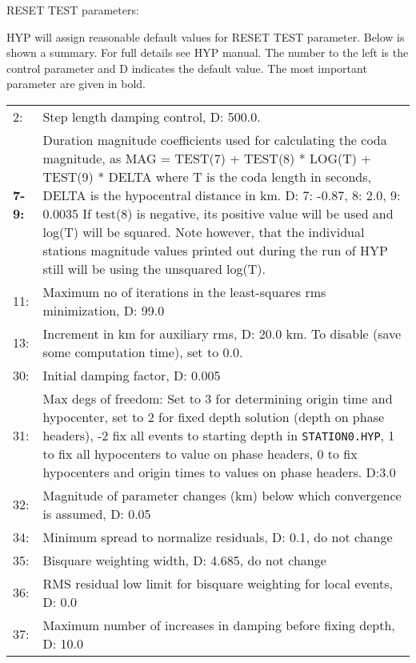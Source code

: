 RESET TEST parameters: 

HYP will assign reasonable default values for RESET TEST parameter. Below is shown a summary. For full details see HYP manual. The number to the left is the control parameter and D indicates the default value. The most important parameter are given in bold. 

\begin{longtable}{lp{14.5cm}}
2: & Step length damping control, D: 500.0. \\
\textbf{7-9:} & \index{Duration magnitude}Duration \index{Magnitude}magnitude coefficients used for calculating the coda magnitude, as MAG = TEST(7) + TEST(8) * LOG(T) + TEST(9) * DELTA  where\index{Coda magnitude} T is the \index{Coda length}coda length in seconds, DELTA is the hypocentral distance in km. 
D: 7: -0.87, 8: 2.0, 9: 0.0035 \citep{lee1972} If test(8) is negative, its positive value will be used and log(T) will be squared. Note however, that the individual stations magnitude values printed out during the run of HYP still will be using the unsquared log(T). \\
11: &  	\index{Maximum no of iterations}Maximum no of iterations in the least-squares rms minimization, 
D: 99.0 \\
13: &  	Increment in km for auxiliary rms, D: 20.0 km.  To disable (save some computation time), set to 
0.0. \\
30: &  	Initial damping factor, D: 0.005 \\
31: &  	Max degs of freedom: Set to 3 for determining origin time and hypocenter, set to 2 for fixed depth solution (depth on phase headers), -2 fix all events to starting depth\index{Fixing location}\index{Fixing depth}\index{Fixing origin time} in \texttt{STATION0.HYP}, 1 to fix all hypocenters to value on phase headers, 0 to fix hypocenters and origin times to values on phase headers. D:3.0   \\
32: &  	Magnitude of parameter changes (km) below which convergence is assumed, D: 0.05 \\
34: &  	Minimum spread to normalize residuals, D: 0.1, do not change \\
35: &  	Bisquare weighting width, D: 4.685, do not change \\
36: &  	RMS residual low limit for bisquare weighting for local events, D: 0.0 \\
37: &  	Maximum number of increases in damping before fixing depth, D: 10.0 \\

\end{longtable}
